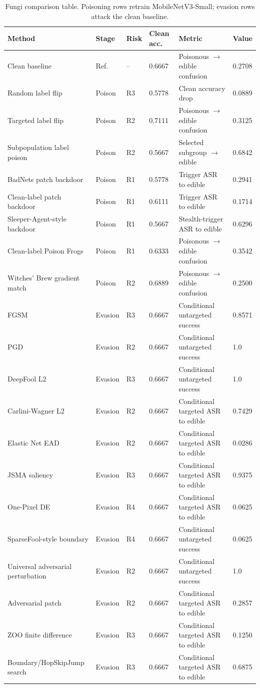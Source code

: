 \documentclass[conference]{IEEEtran}
\begin{document}
\begin{table}[t]
\centering
\caption{Fungi comparison table. Poisoning rows retrain MobileNetV3-Small; evasion rows attack the clean baseline.}
\label{tab:results}
\small
\begin{tabular}{p{}p{}p{}p{}p{}p{}}
\toprule
Method & Stage & Risk & Clean acc. & Metric & Value \\
\midrule
Clean baseline & Ref. & -- & 0.6667 & Poisonous \(\rightarrow\) edible confusion & 0.2708 \\
Random label flip & Poison & R3 & 0.5778 & Clean accuracy drop & 0.0889 \\
Targeted label flip & Poison & R2 & 0.7111 & Poisonous \(\rightarrow\) edible confusion & 0.3125 \\
Subpopulation label poison & Poison & R2 & 0.5667 & Selected subgroup \(\rightarrow\) edible & 0.6842 \\
BadNets patch backdoor & Poison & R1 & 0.5778 & Trigger ASR to edible & 0.2941 \\
Clean-label patch backdoor & Poison & R1 & 0.6111 & Trigger ASR to edible & 0.1714 \\
Sleeper-Agent-style backdoor & Poison & R1 & 0.5667 & Stealth-trigger ASR to edible & 0.6296 \\
Clean-label Poison Frogs & Poison & R1 & 0.6333 & Poisonous \(\rightarrow\) edible confusion & 0.3542 \\
Witches' Brew gradient match & Poison & R2 & 0.6889 & Poisonous \(\rightarrow\) edible confusion & 0.2500 \\
FGSM & Evasion & R3 & 0.6667 & Conditional untargeted success & 0.8571 \\
PGD & Evasion & R2 & 0.6667 & Conditional untargeted success & 1.0 \\
DeepFool L2 & Evasion & R3 & 0.6667 & Conditional untargeted success & 1.0 \\
Carlini-Wagner L2 & Evasion & R2 & 0.6667 & Conditional targeted ASR to edible & 0.7429 \\
Elastic Net EAD & Evasion & R2 & 0.6667 & Conditional targeted ASR to edible & 0.0286 \\
JSMA saliency & Evasion & R3 & 0.6667 & Conditional targeted ASR to edible & 0.9375 \\
One-Pixel DE & Evasion & R4 & 0.6667 & Conditional targeted ASR to edible & 0.0625 \\
SparseFool-style boundary & Evasion & R4 & 0.6667 & Conditional untargeted success & 0.0625 \\
Universal adversarial perturbation & Evasion & R2 & 0.6667 & Conditional untargeted success & 1.0 \\
Adversarial patch & Evasion & R2 & 0.6667 & Conditional targeted ASR to edible & 0.2857 \\
ZOO finite difference & Evasion & R3 & 0.6667 & Conditional targeted ASR to edible & 0.1250 \\
Boundary/HopSkipJump search & Evasion & R3 & 0.6667 & Conditional targeted ASR to edible & 0.6875 \\
\bottomrule
\end{tabular}
\end{table}
\end{document}
